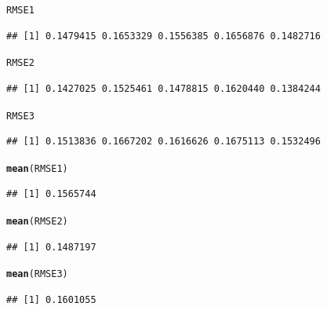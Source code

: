 \documentclass[oneside]{book}\usepackage[]{graphicx}\usepackage[dvipsnames,table,xcdraw]{xcolor}
\makeatletter
\newcommand{\hlstd}[1]{\textcolor[rgb]{0.345,0.345,0.345}{#1}}%
\newcommand{\hlkwd}[1]{\textcolor[rgb]{0.737,0.353,0.396}{\textbf{#1}}}%
\newenvironment{kframe}{%
 \def\at@end@of@kframe{}%
 \ifinner\ifhmode%
  \def\at@end@of@kframe{\end{minipage}}%
  \begin{minipage}{\columnwidth}%
 \fi\fi%
 \def\FrameCommand##1{\hskip\@totalleftmargin \hskip-\fboxsep
 \colorbox{shadecolor}{##1}\hskip-\fboxsep
     \hskip-\linewidth \hskip-\@totalleftmargin \hskip\columnwidth}%
 \MakeFramed {\advance\hsize-\width
   \@totalleftmargin\z@ \linewidth\hsize
   \@setminipage}}%
 {\par\unskip\endMakeFramed%
 \at@end@of@kframe}
\newenvironment{knitrout}{}{} %
\makeatother
\begin{document}
\begin{knitrout}
\begin{kframe}
\begin{alltt}
\hlstd{RMSE1}
\end{alltt}
\begin{verbatim}
## [1] 0.1479415 0.1653329 0.1556385 0.1656876 0.1482716
\end{verbatim}
\begin{alltt}
\hlstd{RMSE2}
\end{alltt}
\begin{verbatim}
## [1] 0.1427025 0.1525461 0.1478815 0.1620440 0.1384244
\end{verbatim}
\begin{alltt}
\hlstd{RMSE3}
\end{alltt}
\begin{verbatim}
## [1] 0.1513836 0.1667202 0.1616626 0.1675113 0.1532496
\end{verbatim}
\begin{alltt}
\hlkwd{mean}\hlstd{(RMSE1)}
\end{alltt}
\begin{verbatim}
## [1] 0.1565744
\end{verbatim}
\begin{alltt}
\hlkwd{mean}\hlstd{(RMSE2)}
\end{alltt}
\begin{verbatim}
## [1] 0.1487197
\end{verbatim}
\begin{alltt}
\hlkwd{mean}\hlstd{(RMSE3)}
\end{alltt}
\begin{verbatim}
## [1] 0.1601055
\end{verbatim}
\end{kframe}
\end{knitrout}

\end{document}
